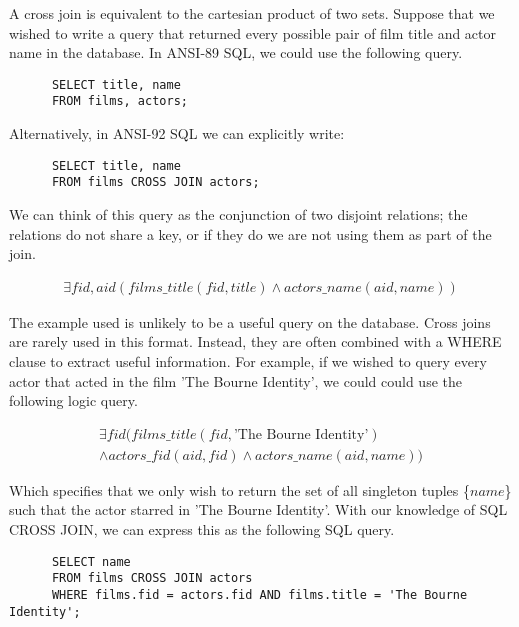 \documentclass[a4paper, 11pt]{article}
\begin{document}
      A cross join is equivalent to the cartesian product of two sets. Suppose
      that we wished to write a query that returned every possible pair of
      film title and actor name in the database. In ANSI-89 SQL, we could use 
      the following query.

      \begin{verbatim}
      SELECT title, name
      FROM films, actors;
      \end{verbatim}

      Alternatively, in ANSI-92 SQL we can explicitly write:

      \begin{verbatim}
      SELECT title, name
      FROM films CROSS JOIN actors;
      \end{verbatim}

      We can think of this query as the conjunction of two disjoint relations;
      the relations do not share a key, or if they do we are not using them as
      part of the join.

      \begin{gather}
        \exists fid, aid(films\_title(fid, title) \land actors\_name(aid, name))
      \end{gather}

      The example used is unlikely to be a useful query on the database. Cross
      joins are rarely used in this format. Instead, they are often combined
      with a WHERE clause to extract useful information. For example, if we
      wished to query every actor that acted in the film 'The Bourne Identity',
      we could could use the following logic query.

      \begin{gather}
        \exists fid(films\_title(fid, \text{'The Bourne Identity'}) \\
        \land actors\_fid(aid, fid) \land actors\_name(aid, name))
      \end{gather}

      Which specifies that we only wish to return the set of all singleton
      tuples \{$name$\} such that the actor starred in 'The Bourne Identity'.
      With our knowledge of SQL CROSS JOIN, we can express this as the
      following SQL query.

      \begin{verbatim}
      SELECT name
      FROM films CROSS JOIN actors
      WHERE films.fid = actors.fid AND films.title = 'The Bourne Identity';
      \end{verbatim}
\end{document}
